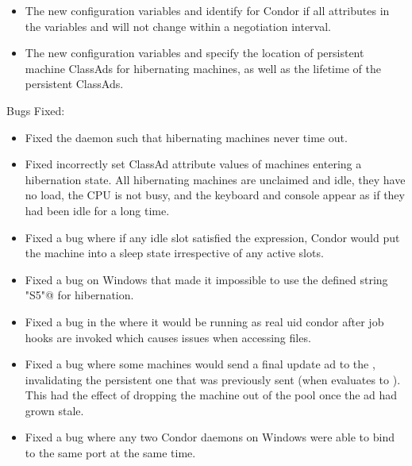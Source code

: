 \begin{itemize}
\item The new configuration variables 
  and  identify for Condor if all
  attributes in the variables  and
   will not change within
  a negotiation interval.

\item The new configuration variables 
  and  specify the location of
  persistent machine ClassAds for hibernating machines,
  as well as the lifetime of the persistent ClassAds.

\end{itemize}

\noindent Bugs Fixed:

\begin{itemize}

\item Fixed the  daemon such that hibernating machines
  never time out.

\item Fixed incorrectly set ClassAd attribute values of machines
  entering a hibernation state.
  All hibernating machines are unclaimed and idle,
  they have no load, the CPU is not busy, and
  the keyboard and console appear as if they had been idle for a long time.

\item Fixed a bug where if any idle slot satisfied the
   expression, Condor would put the machine into a
  sleep state irrespective of any active slots.

\item Fixed a bug on Windows that made it impossible to use
  the defined string \verb@"S5"@ for hibernation.

\item Fixed a bug in the  where it would be running as
  real uid condor after job hooks are invoked which causes issues when
  accessing files.

\item Fixed a bug where some machines would send a final update ad to
  the , invalidating the persistent one that was
  previously sent (when  evaluates to ).
  This had the effect of dropping the machine out of the pool once the
  ad had grown stale.

\item Fixed a bug where any two Condor daemons on Windows were able to
  bind to the same port at the same time.


\end{itemize}
